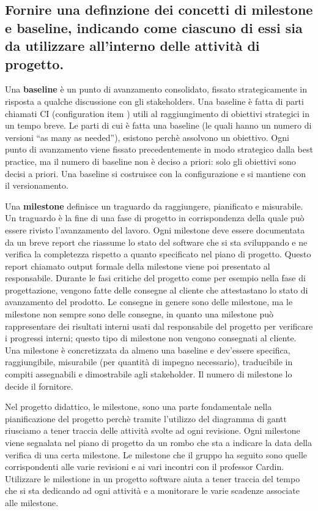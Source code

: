 \subsection{Fornire una definzione dei concetti di \textbf{milestone} e \textbf{baseline}, indicando come ciascuno di essi sia da utilizzare all'interno delle attività di progetto.}
Una \textbf{baseline} è un punto di avanzamento consolidato, fissato strategicamente in risposta a qualche discussione con gli stakeholders. Una baseline è fatta di parti chiamati CI (configuration item ) utili al raggiungimento di obiettivi strategici in un tempo breve. Le parti di cui è fatta una baseline (le quali hanno un numero di versioni “as many as needed”), esistono perchè assolvono un obiettivo.
Ogni punto di avanzamento viene fissato precedentemente in modo strategico dalla best practice, ma il numero di baseline non è deciso a priori:  solo gli obiettivi sono decisi a priori.
Una baseline si costruisce con la configurazione e si mantiene con il versionamento.

Una \textbf{milestone} definisce un traguardo da raggiungere, pianificato e misurabile. Un traguardo è la fine di una fase di progetto in corrispondenza della quale può essere rivisto l'avanzamento del lavoro. Ogni milestone deve essere documentata da un breve report che riassume lo stato del software che si sta sviluppando e ne verifica la completezza rispetto a quanto specificato nel piano di progetto.
Questo report chiamato output formale della milestone viene poi presentato al responsabile.
Durante le fasi critiche del progetto come per esempio nella fase di progettazione, vengono fatte delle consegne al cliente che attestastano lo stato di avanzamento del prodotto. Le consegne in genere sono delle milestone, ma le milestone non sempre sono delle consegne, in quanto una milestone può rappresentare dei risultati interni usati dal responsabile del progetto per verificare i progressi interni; questo tipo di milestone non vengono consegnati al cliente. Una milestone è concretizzata da almeno una baseline e dev'essere specifica, raggiungibile, misurabile (per quantità di impegno necessario), traducibile in compiti assegnabili e dimostrabile agli stakeholder. Il numero di milestone lo decide il fornitore.


Nel progetto didattico, le milestone, sono una parte fondamentale nella pianificazione del progetto perchè tramite l'utilizzo del diagramma di gantt riusciamo a tener traccia delle attività svolte ad ogni revisione. Ogni milestone viene segnalata nel piano di progetto da un rombo che sta a indicare la data della verifica di una certa milestone. Le milestone che il gruppo ha seguito sono quelle corrispondenti alle varie revisioni e ai vari incontri con il professor Cardin.
Utilizzare le milestione in un progetto software aiuta a tener traccia del tempo che si sta dedicando ad ogni attività e a monitorare le varie scadenze associate alle milestone.